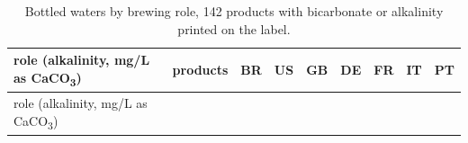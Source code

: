 \documentclass[
  a4paper,
]{article}
\begin{document}
\begin{longtable}[]{@{}
  >{\raggedright\arraybackslash}p{}
  >{\raggedright\arraybackslash}p{}
  >{\raggedright\arraybackslash}p{}
  >{\raggedright\arraybackslash}p{}
  >{\raggedright\arraybackslash}p{}
  >{\raggedright\arraybackslash}p{}
  >{\raggedright\arraybackslash}p{}
  >{\raggedright\arraybackslash}p{}
  >{\raggedright\arraybackslash}p{}@{}}
\caption{Bottled waters by brewing role, 142 products with bicarbonate
or alkalinity printed on the label.}\label{tbl-bottled}\tabularnewline
\toprule\noalign{}
\begin{minipage}[b]{\linewidth}\raggedright
role (alkalinity, mg/L as CaCO\textsubscript{3})
\end{minipage} & \begin{minipage}[b]{\linewidth}\raggedright
products
\end{minipage} & \begin{minipage}[b]{\linewidth}\raggedright
BR
\end{minipage} & \begin{minipage}[b]{\linewidth}\raggedright
US
\end{minipage} & \begin{minipage}[b]{\linewidth}\raggedright
GB
\end{minipage} & \begin{minipage}[b]{\linewidth}\raggedright
DE
\end{minipage} & \begin{minipage}[b]{\linewidth}\raggedright
FR
\end{minipage} & \begin{minipage}[b]{\linewidth}\raggedright
IT
\end{minipage} & \begin{minipage}[b]{\linewidth}\raggedright
PT
\end{minipage} \\
\midrule\noalign{}
\endfirsthead
\toprule\noalign{}
\begin{minipage}[b]{\linewidth}\raggedright
role (alkalinity, mg/L as CaCO\textsubscript{3})
\end{minipage} & \begin{minipage}[b]{\linewidth}\raggedright

\end{minipage}
\end{longtable}
\end{document}
